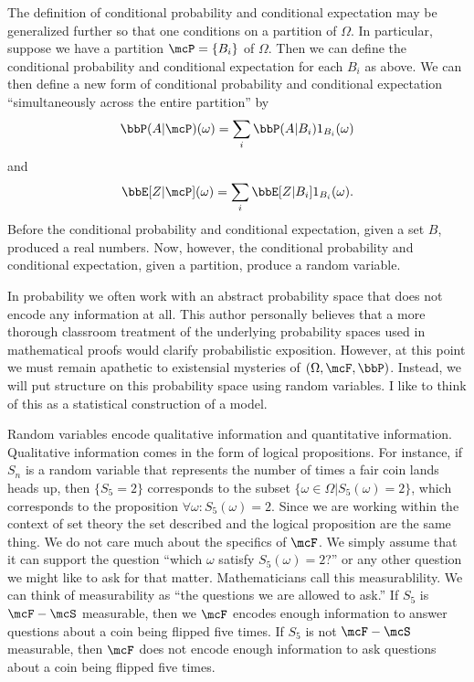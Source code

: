 \documentclass{report}
\begin{document}
The definition of conditional probability and conditional expectation may be generalized further so that one conditions on a partition of $\Omega$.  In particular, suppose we have a partition $\mcP = \{B_i\}$ of $\Omega$.  Then we can define the conditional probability and conditional expectation for each $B_i$ as above.  We can then define a new form of conditional probability and conditional expectation ``simultaneously across the entire partition'' by
\[
\bbP(A | \mcP)(\omega) = \sum_{i} \bbP(A|B_i) 1_{B_i}(\omega)
\]
and
\[
\bbE[Z | \mcP](\omega) = \sum_{i} \bbE[Z|B_i] 1_{B_i}(\omega).
\]
Before the conditional probability and conditional expectation, given a set $B$, produced a real numbers.  Now, however, the conditional probability and conditional expectation, given a partition, produce a random variable.

In probability we often work with an abstract probability space that does not encode any information at all.  This author personally believes that a more thorough classroom treatment of the underlying probability spaces used in mathematical proofs would clarify probabilistic exposition.  However, at this point we must remain apathetic to existensial mysteries of $(\Omega, \mcF, \bbP)$.  Instead, we will put structure on this probability space using random variables.  I like to think of this as a statistical construction of a model.  

Random variables encode qualitative information and quantitative information.  Qualitative information comes in the form of logical propositions.  For instance, if $S_n$ is a random variable that represents the number of times a fair coin lands heads up, then $\{S_5 = 2\}$ corresponds to the subset $\{\omega \in \Omega | S_5(\omega) = 2\}$, which corresponds to the proposition $\forall \omega : S_5(\omega) = 2$.  Since we are working within the context of set theory the set described and the logical proposition are the same thing.  We do not care much about the specifics of $\mcF$.  We simply assume that it can support the question ``which $\omega$ satisfy $S_5(\omega) = 2$?'' or any other question we might like to ask for that matter.  Mathematicians call this measurablility.  We can think of measurability as ``the questions we are allowed to ask.''  If $S_5$ is $\mcF-\mcS$ measurable, then we $\mcF$ encodes enough information to answer questions about a coin being flipped five times.  If $S_5$ is not $\mcF-\mcS$ measurable, then $\mcF$ does not encode enough information to ask questions about a coin being flipped five times.
\end{document}
